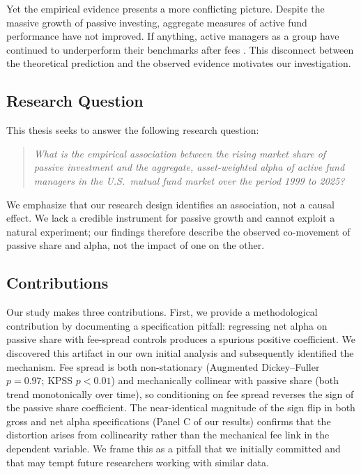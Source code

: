 \documentclass[11pt, a4paper]{article}
\begin{document}
Yet the empirical evidence presents a more conflicting picture. Despite the massive growth of passive investing, aggregate measures of active fund performance have not improved. If anything, active managers as a group have continued to underperform their benchmarks after fees \parencite{fama2010}. This disconnect between the theoretical prediction and the observed evidence motivates our investigation.

\subsection{Research Question}

This thesis seeks to answer the following research question:

\begin{quote}
    \textit{What is the empirical association between the rising market share of passive investment and the aggregate, asset-weighted alpha of active fund managers in the U.S.\ mutual fund market over the period 1999 to 2025?}
\end{quote}

We emphasize that our research design identifies an association, not a causal effect. We lack a credible instrument for passive growth and cannot exploit a natural experiment; our findings therefore describe the observed co-movement of passive share and alpha, not the impact of one on the other.

\subsection{Contributions}

Our study makes three contributions. First, we provide a methodological contribution by documenting a specification pitfall: regressing net alpha on passive share with fee-spread controls produces a spurious positive coefficient. We discovered this artifact in our own initial analysis and subsequently identified the mechanism. Fee spread is both non-stationary (Augmented Dickey--Fuller $p = 0.97$; KPSS $p < 0.01$) and mechanically collinear with passive share (both trend monotonically over time), so conditioning on fee spread reverses the sign of the passive share coefficient. The near-identical magnitude of the sign flip in both gross and net alpha specifications (Panel C of our results) confirms that the distortion arises from collinearity rather than the mechanical fee link in the dependent variable. We frame this as a pitfall that we initially committed and that may tempt future researchers working with similar data.
\end{document}
